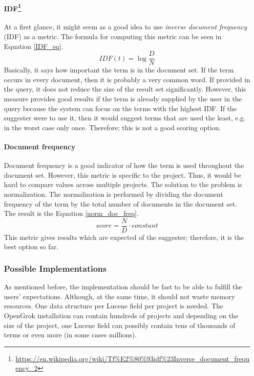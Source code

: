 \paragraph{IDF\protect\footnote{\url{https://en.wikipedia.org/wiki/Tf\%E2\%80\%93idf\%23Inverse\_document\_frequency\_2}}}
At a first glance, it might seem as a good idea to use \textit{inverse document frequency} (IDF) as a metric. The formula for computing this metric can be seen in Equation \ref{IDF_eq}.
\begin{equation}
\label{IDF_eq}
IDF(t) = \log{\frac{D}{N}}
\end{equation}
Basically, it says how important the term is in the document set. If the term occurs in every document, then it is probably
a very common word. If provided in the query, it does not reduce the size of the result set significantly.
However, this measure provides good results if the term is
already supplied by the user in the query because the system can focus on the terms with the highest IDF.
If the suggester were to use it, then it would suggest terms that are used the least, e.g. in the worst case only once.
Therefore; this is not a good scoring option.

\paragraph{Document frequency}
Document frequency is a good indicator of how the term is used throughout the document set. However,
this metric is specific to the project. Thus, it would be hard to compare values across multiple projects. The solution
to the problem is normalization. The normalization is performed by dividing the document frequency of the term by the total number of documents in the document set.
The result is the Equation \ref{norm_doc_freq}.
\begin{equation}
\label{norm_doc_freq}
score = \frac{N}{D} \cdot constant
\end{equation}
This metric gives results which are expected of the suggester; therefore, it is the best option so far.

\subsubsection{Possible Implementations}
\label{possible_implementations}
As mentioned before, the implementation should be fast to be able to fulfill the users' expectations. Although, at the
same time, it should not waste memory resources. One data structure per Lucene field per project is needed. The OpenGrok
installation can contain hundreds of projects and depending on the size of the project, one Lucene field can possibly contain
tens of thousands of terms or even more (in some cases millions).

